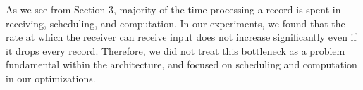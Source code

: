 As we see from Section 3, majority of the time processing a record is spent in receiving, scheduling, and computation. In our experiments, we found that the rate at which the receiver can receive input does not increase significantly even if it drops every record. Therefore, we did not treat this bottleneck as a problem fundamental within the architecture, and focused on scheduling and computation in our optimizations.


%
%
%

